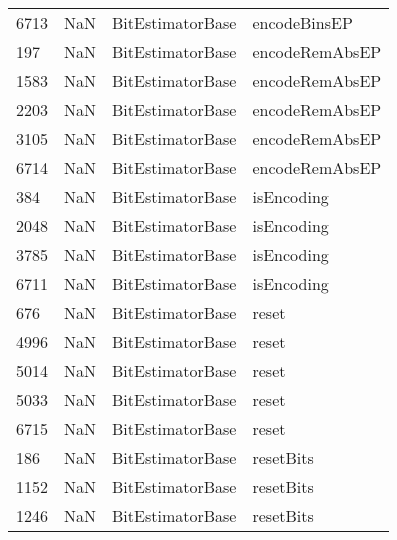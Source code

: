 \begin{tabular}{llll}
6713 &                   NaN &           BitEstimatorBase &                              encodeBinsEP \\
197  &                   NaN &           BitEstimatorBase &                            encodeRemAbsEP \\
1583 &                   NaN &           BitEstimatorBase &                            encodeRemAbsEP \\
2203 &                   NaN &           BitEstimatorBase &                            encodeRemAbsEP \\
3105 &                   NaN &           BitEstimatorBase &                            encodeRemAbsEP \\
6714 &                   NaN &           BitEstimatorBase &                            encodeRemAbsEP \\
384  &                   NaN &           BitEstimatorBase &                                isEncoding \\
2048 &                   NaN &           BitEstimatorBase &                                isEncoding \\
3785 &                   NaN &           BitEstimatorBase &                                isEncoding \\
6711 &                   NaN &           BitEstimatorBase &                                isEncoding \\
676  &                   NaN &           BitEstimatorBase &                                     reset \\
4996 &                   NaN &           BitEstimatorBase &                                     reset \\
5014 &                   NaN &           BitEstimatorBase &                                     reset \\
5033 &                   NaN &           BitEstimatorBase &                                     reset \\
6715 &                   NaN &           BitEstimatorBase &                                     reset \\
186  &                   NaN &           BitEstimatorBase &                                 resetBits \\
1152 &                   NaN &           BitEstimatorBase &                                 resetBits \\
1246 &                   NaN &           BitEstimatorBase &                                 resetBits \\

\end{tabular}
